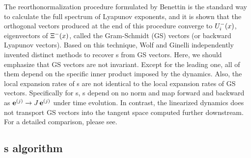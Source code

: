 The reorthonormalization procedure
formulated by Benettin \etal{}
is
the standard way to calculate the full spectrum of Lyapunov exponents,
and it is shown
that the orthogonal vectors produced at the end of
this procedure converge to $U_i^{-}(\ssp)$, eigenvectors of $\Xi^{-}(\ssp)$, called
the Gram-Schmidt (GS) vectors (or backward Lyapunov vectors).
Based on this technique,
Wolf \etal{} and
Ginelli \etal{}
independently invented distinct methods to recover \cLv s
from GS vectors. Here, we should emphasize that GS vectors are
not invariant. Except for the leading one, all of them depend on
the specific inner product imposed by the dynamics. Also, the local expansion
rates of \cLv s are not
identical to the local expansion rates of GS vectors. Specifically for
\po s, \Fv s depend on no norm and map forward and
backward as $\jEigvec[j] \to \jMps\,\jEigvec[j]$ under time evolution.
In contrast, the linearized dynamics does not transport GS vectors into
the tangent space computed further downstream. For a detailed
comparison, please see.

\subsection{\CLv s algorithm}
\label{subsec:clvs}

